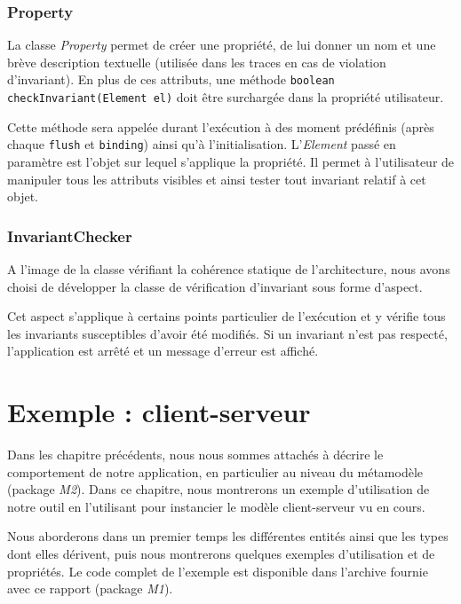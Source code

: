         \subsection{Property}
        	La classe \emph{Property} permet de créer une propriété, de lui donner un nom et une brève description textuelle (utilisée dans les traces en cas de violation d'invariant). En plus de ces attributs, une méthode \lstinline{boolean checkInvariant(Element el)} doit être surchargée dans la propriété utilisateur.
            \newline
            
            Cette méthode sera appelée durant l'exécution à des moment prédéfinis (après chaque \lstinline{flush} et \lstinline{binding}) ainsi qu'à l'initialisation. L'\emph{Element} passé en paramètre est l'objet sur lequel s'applique la propriété. Il permet à l'utilisateur de manipuler tous les attributs visibles et ainsi tester tout invariant relatif à cet objet.
		
        \subsection{InvariantChecker}
        	A l'image de la classe vérifiant la cohérence statique de l'architecture, nous avons choisi de développer la classe de vérification d'invariant sous forme d'aspect.
            \newline
            
            Cet aspect s'applique à certains points particulier de l'exécution et y vérifie tous les invariants susceptibles d'avoir été modifiés. Si un invariant n'est pas respecté, l'application est arrêté et un message d'erreur est affiché.

\chapter{Exemple : client-serveur}
\label{cs-chapter}

	Dans les chapitre précédents, nous nous sommes attachés à décrire le comportement de notre application, en particulier au niveau du métamodèle (package \emph{M2}). Dans ce chapitre, nous montrerons un exemple d'utilisation de notre outil en l'utilisant pour instancier le modèle client-serveur vu en cours.
    \newline
    
    Nous aborderons dans un premier temps les différentes entités ainsi que les types dont elles dérivent, puis nous montrerons quelques exemples d'utilisation et de propriétés. Le code complet de l'exemple est disponible dans l'archive fournie avec ce rapport (package \emph{M1}).
    
